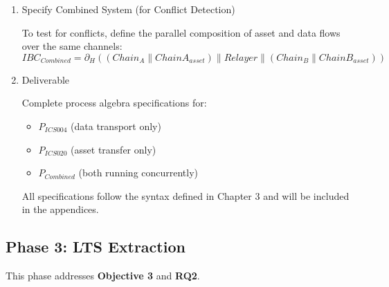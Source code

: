 \begin{enumerate}
  Define the complete IBC asset transfer system: \[
  IBC_{Asset} = \partial_H( ChainA_{asset} \parallel Relayer \parallel ChainB_{asset} )
  \]
\item
  Specify Combined System (for Conflict Detection)

  To test for conflicts, define the parallel composition of asset and
  data flows over the same channels: \[
  IBC_{Combined} = \partial_H( (Chain_A \parallel ChainA_{asset}) \parallel Relayer \parallel (Chain_B \parallel ChainB_{asset}) )
  \]
\item
  Deliverable

  Complete process algebra specifications for:

  \begin{itemize}
      \item \(P_{ICS004}\) (data transport only)
      \item \(P_{ICS020}\) (asset transfer only)
      \item \(P_{Combined}\) (both running concurrently)
  \end{itemize}

  All specifications follow the syntax defined in Chapter 3 and will be
  included in the appendices.
\end{enumerate}

\subsection{Phase 3: LTS Extraction}\label{phase-3-lts-extraction}

This phase addresses \textbf{Objective 3} and \textbf{RQ2}.

